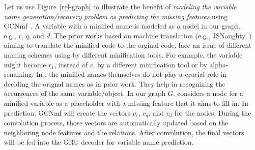 Let us use Figure~\ref{rel-graph} to illustrate the benefit of {\em
modeling the variable name generation/recovery problem as predicting
the missing features} using GCNmf~\cite{GCNmf}. A variable with a
minified name is modeled as a nodel in our graph, e.g., $r$, $q$, and
$d$.  The prior works based on machine translation (e.g.,
JSNaughty~\cite{JSNaughty2017}) aiming to translate the minified code
to the orginal code, face an issue of different naming schemes using
by different minification tools. For example, the
variable  might become $r_1$, instead of $r$, by a
different minification tool or by alpha-renaming. In {\tool}, the
minified names themselves do not play a crucial role in deciding the
orignal names as in prior work. They help in recognizing the
occurrences of the same variable/object.  In our graph $G$, {\tool}
considers a node for a minified variable as a placeholder with a
missing feature that it aims to fill in.  In prediction, GCNmf will
create the vectors $v_r$, $v_q$, and $v_d$ for the nodes. During the
convolution process, those vectors are automatically updated based on
the neighboring node features and the relations. After convolution,
the final vectors will be fed into the GRU decoder for variable name
prediction.


